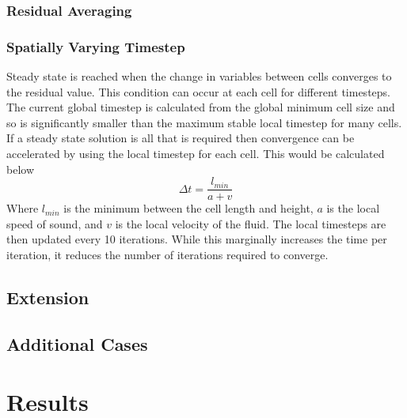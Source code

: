 \documentclass{article}
\begin{document}
\subsubsection{Residual Averaging}



\subsubsection{Spatially Varying Timestep}

Steady state is reached when the change in variables between cells converges to the residual value.
This condition can occur at each cell for different timesteps.
The current global timestep is calculated from the global minimum cell size and so is significantly smaller than the maximum stable local timestep for many cells.
If a steady state solution is all that is required then convergence can be accelerated by using the local timestep for each cell.
This would be calculated below
\begin{equation}
    \Delta t = \frac{l_{min}}{a + v}
\end{equation}
Where $l_{min}$ is the minimum between the cell length and height, $a$ is the local speed of sound, and $v$ is the local velocity of the fluid.
The local timesteps are then updated every 10 iterations.
While this marginally increases the time per iteration, it reduces the number of iterations required to converge.


\subsection{Extension}


\subsection{Additional Cases}


\section{Results}
\end{document}

